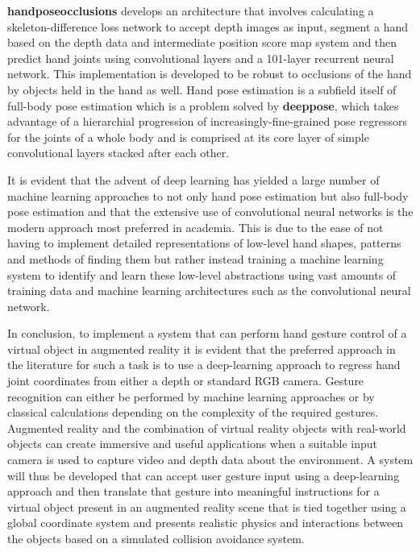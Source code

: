 \textbf{handposeocclusions} develops an architecture that involves calculating a skeleton-difference loss network to accept depth images as input, segment a hand based on the depth data and intermediate position score map system and then predict hand joints using convolutional layers and a 101-layer recurrent neural network. This implementation is developed to be robust to occlusions of the hand by objects held in the hand as well. Hand pose estimation is a subfield itself of full-body pose estimation which is a problem solved by \textbf{deeppose}, which takes advantage of a hierarchial progression of increasingly-fine-grained pose regressors for the joints of a whole body and is comprised at its core layer of simple convolutional layers stacked after each other. 

It is evident that the advent of deep learning has yielded a large number of machine learning approaches to not only hand pose estimation but also full-body pose estimation and that the extensive use of convolutional neural networks is the modern approach most preferred in academia. This is due to the ease of not having to implement detailed representations of low-level hand shapes, patterns and methods of finding them but rather instead training a machine learning system to identify and learn these low-level abstractions using vast amounts of training data and machine learning architectures such as the convolutional neural network.

In conclusion, to implement a system that can perform hand gesture control of a virtual object in augmented reality it is evident that the preferred approach in the literature for such a task is to use a deep-learning approach to regress hand joint coordinates from either a depth or standard RGB camera. Gesture recognition can either be performed by machine learning approaches or by classical calculations depending on the complexity of the required gestures. Augmented reality and the combination of virtual reality objects with real-world objects can create immersive and useful applications when a suitable input camera is used to capture video and depth data about the environment. A system will thus be developed that can accept user gesture input using a deep-learning approach and then translate that gesture into meaningful instructions for a virtual object present in an augmented reality scene that is tied together using a global coordinate system and presents realistic physics and interactions between the objects based on a simulated collision avoidance system.


